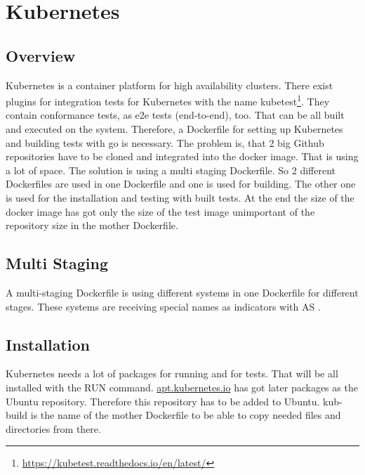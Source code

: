 \usepackage{verbatim}

\chapter{Kubernetes}\label{ch:kubernetes}

\section{Overview}

Kubernetes is a container platform for high availability clusters.
There exist plugins for integration tests for Kubernetes with the name kubetest\footnote{\url{https://kubetest.readthedocs.io/en/latest/}}. They contain conformance tests, as e2e tests (end-to-end), too.
That can be all built and executed on the system. Therefore, a Dockerfile for setting up Kubernetes and building tests with go is necessary. The problem is, that 2 big Github repositories have to be cloned and integrated into the docker image. That is using a lot of space. The solution is using a multi staging Dockerfile. 
So 2 different Dockerfiles are used in one Dockerfile and one is used for building. The other one is used for the installation and testing with built tests. At the end the size of the docker image has got only the size of the test image unimportant of the repository size in the mother Dockerfile.

\section{Multi Staging}

A multi-staging Dockerfile is using different systems in one Dockerfile for different stages. These systems are receiving special names as indicators with \ldq AS \rdq.

\section{Installation}

Kubernetes needs a lot of packages for running and for tests. That will be all installed with the RUN command.
\url{apt.kubernetes.io} has got later packages as the Ubuntu repository. Therefore this repository has to be added to Ubuntu. kub-build is the name of the mother Dockerfile to be able to copy needed files and directories from there.


